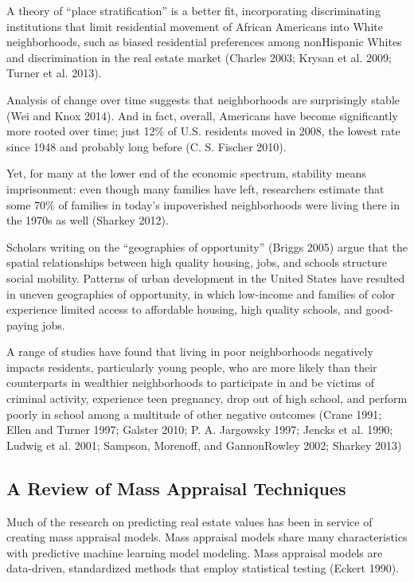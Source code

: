 \documentclass[]{article}
\begin{document}
A theory of ``place stratification'' is a better fit, incorporating
discriminating institutions that limit residential movement of African
Americans into White neighborhoods, such as biased residential
preferences among nonHispanic Whites and discrimination in the real
estate market (Charles 2003; Krysan et al. 2009; Turner et al. 2013).

Analysis of change over time suggests that neighborhoods are
surprisingly stable (Wei and Knox 2014). And in fact, overall, Americans
have become significantly more rooted over time; just 12\% of U.S.
residents moved in 2008, the lowest rate since 1948 and probably long
before (C. S. Fischer 2010).

Yet, for many at the lower end of the economic spectrum, stability means
imprisonment: even though many families have left, researchers estimate
that some 70\% of families in today's impoverished neighborhoods were
living there in the 1970s as well (Sharkey 2012).

Scholars writing on the ``geographies of opportunity'' (Briggs 2005)
argue that the spatial relationships between high quality housing, jobs,
and schools structure social mobility. Patterns of urban development in
the United States have resulted in uneven geographies of opportunity, in
which low-income and families of color experience limited access to
affordable housing, high quality schools, and good-paying jobs.

A range of studies have found that living in poor neighborhoods
negatively impacts residents, particularly young people, who are more
likely than their counterparts in wealthier neighborhoods to participate
in and be victims of criminal activity, experience teen pregnancy, drop
out of high school, and perform poorly in school among a multitude of
other negative outcomes (Crane 1991; Ellen and Turner 1997; Galster
2010; P. A. Jargowsky 1997; Jencks et al. 1990; Ludwig et al. 2001;
Sampson, Morenoff, and GannonRowley 2002; Sharkey 2013)

\subsection{A Review of Mass Appraisal
Techniques}\label{a-review-of-mass-appraisal-techniques}

Much of the research on predicting real estate values has been in
service of creating mass appraisal models. Mass appraisal models share
many characteristics with predictive machine learning model modeling.
Mass appraisal models are data-driven, standardized methods that employ
statistical testing (Eckert 1990).
\end{document}
